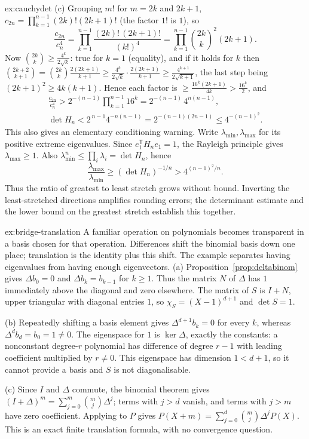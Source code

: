 \begin{solution}{ex:cauchydet}
(c) Grouping $m!$ for $m=2k$ and $2k+1$, $c_{2n}=\prod_{k=1}^{n-1}(2k)!(2k+1)!$ (the factor $1!$ is $1$), so
\[
\frac{c_{2n}}{c_n^4}=\prod_{k=1}^{n-1}\frac{(2k)!\,(2k+1)!}{(k!)^4}=\prod_{k=1}^{n-1}\binom{2k}k^2(2k+1).
\]
Now $\binom{2k}k\ge\frac{4^k}{2\sqrt k}$: true for $k=1$ (equality), and if it holds for $k$ then $\binom{2k+2}{k+1}=\binom{2k}k\frac{2(2k+1)}{k+1}\ge\frac{4^k}{2\sqrt k}\cdot\frac{2(2k+1)}{k+1}\ge\frac{4^{k+1}}{2\sqrt{k+1}}$, the last step being $(2k+1)^2\ge4k(k+1)$. Hence each factor is $\ge\frac{16^k(2k+1)}{4k}>\frac{16^k}2$, and
\[
\begin{gathered}
\frac{c_{2n}}{c_n^4}>2^{-(n-1)}\prod_{k=1}^{n-1}16^k=2^{-(n-1)}\,4^{n(n-1)},\\
\det H_n<2^{\,n-1}4^{-n(n-1)}=2^{-(n-1)(2n-1)}\le4^{-(n-1)^2}.
\end{gathered}
\]
This also gives an elementary conditioning warning. Write $\lambda_{\min},\lambda_{\max}$ for its positive extreme eigenvalues. Since $e_1^{\mathsf T}H_ne_1=1$, the Rayleigh principle gives $\lambda_{\max}\ge1$. Also $\lambda_{\min}^n\le\prod_i\lambda_i=\det H_n$, hence
\[
\frac{\lambda_{\max}}{\lambda_{\min}}\ge(\det H_n)^{-1/n}>4^{(n-1)^2/n}.
\]
Thus the ratio of greatest to least stretch grows without bound. Inverting the least-stretched directions amplifies rounding errors; the determinant estimate and the lower bound on the greatest stretch establish this together.
\end{solution}

\begin{solution}{ex:bridge-translation}
\idea A familiar operation on polynomials becomes transparent in a basis chosen for that operation. Differences shift the binomial basis down one place; translation is the identity plus this shift. The example separates having eigenvalues from having enough eigenvectors.
\writeup (a) Proposition~\ref{prop:deltabinom} gives $\Delta b_0=0$ and $\Delta b_k=b_{k-1}$ for $k\ge1$. Thus the matrix $N$ of $\Delta$ has $1$ immediately above the diagonal and zero elsewhere. The matrix of $S$ is $I+N$, upper triangular with diagonal entries $1$, so $\chi_S=(X-1)^{d+1}$ and $\det S=1$.

(b) Repeatedly shifting a basis element gives $\Delta^{d+1}b_k=0$ for every $k$, whereas $\Delta^db_d=b_0=1\ne0$. The eigenspace for $1$ is $\ker\Delta$, exactly the constants: a nonconstant degree-$r$ polynomial has difference of degree $r-1$ with leading coefficient multiplied by $r\ne0$. This eigenspace has dimension $1<d+1$, so it cannot provide a basis and $S$ is not diagonalisable.

(c) Since $I$ and $\Delta$ commute, the binomial theorem gives $(I+\Delta)^m=\sum_{j=0}^m\binom mj\Delta^j$; terms with $j>d$ vanish, and terms with $j>m$ have zero coefficient. Applying to $P$ gives $P(X+m)=\sum_{j=0}^d\binom mj\Delta^jP(X)$. This is an exact finite translation formula, with no convergence question.
\end{solution}

